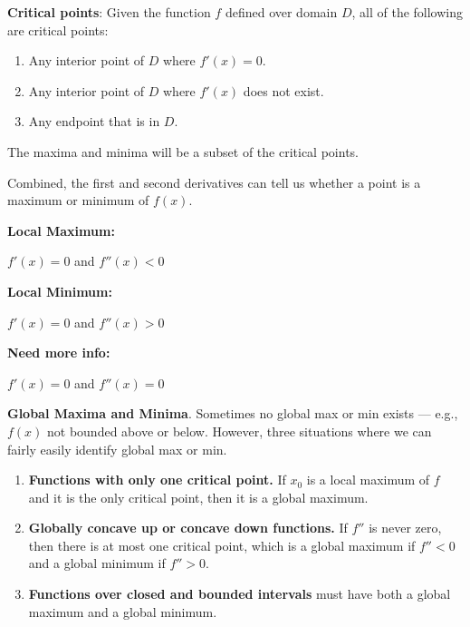 \documentclass[11pt]{article}
\newcommand{\be}{\begin{enumerate}}
\newcommand{\ee}{\end{enumerate}}
\newcommand{\pbt}{\parbox[t]{2in}}
\begin{document}
\item {\bf Critical points}: Given the function $f$ defined over domain
      $D$, all of the following are critical points:
      \be
      \item Any interior point of $D$ where $f'(x)=0$.
      \item Any interior point of $D$ where $f'(x)$ does not exist.
      \item Any endpoint that is in $D$.
      \ee

The maxima and minima will be a subset of the critical points.

\item  Combined, the first and second derivatives can tell us whether a
 point is a maximum or minimum of $f(x)$. \\[6pt]
 \pbt{\bf Local Maximum:} $f'(x)=0$ and $f''(x)<0$\\
 \pbt{\bf Local Minimum:} $f'(x)=0$ and $f''(x)>0$\\
 \pbt{\bf Need more info:} $f'(x)=0$ and $f''(x)=0$

\item {\bf Global Maxima and Minima}. Sometimes no global max or min
 exists --- e.g., $f(x)$ not bounded above or below.  However, three
 situations where we can fairly easily identify global max or min.
   \be
   \item {\bf Functions with only one critical point.} If $x_0$ is a local
    maximum of $f$ and it is the only critical point, then it is a global
    maximum.
   \item {\bf Globally concave up or concave down functions.}  If $f''$
    is never zero, then there is at most one critical point, which is a
    global maximum if $f''<0$ and a global minimum if $f''>0$.
   \item {\bf Functions over closed and bounded intervals} must have both
    a global maximum and a global minimum.
   \ee
\end{document}
